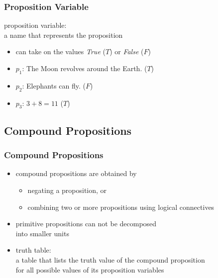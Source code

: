 \documentclass[dvipsnames]{beamer}
\begin{document}
\begin{frame}
  \frametitle{Proposition Variable}

  \begin{definition}
    \alert{proposition variable}:\\
      a name that represents the proposition

    \begin{itemize}
      \item can take on the values \emph {True} ($T$) or \emph{False} ($F$)
    \end{itemize}
  \end{definition}

  \pause
  \begin{example}
    \begin{itemize}
      \item $p_1$: The Moon revolves around the Earth. ($T$)
      \item $p_2$: Elephants can fly. ($F$)
      \item $p_3$: $3+8=11$ ($T$)
    \end{itemize}
  \end{example}
\end{frame}

\subsection{Compound Propositions}

\begin{frame}
  \frametitle{Compound Propositions}

  \begin{itemize}
    \item \alert{compound propositions} are obtained by
    \begin{itemize}
      \item negating a proposition, or
      \item combining two or more propositions using \alert{logical connectives}
    \end{itemize}
    \item \alert{primitive propositions} can not be decomposed\\
      into smaller units
  \end{itemize}

  \pause
  \begin{itemize}
    \item \alert{truth table}:\\
      a table that lists the truth value of the compound proposition\\
      for all possible values of its proposition variables
  \end{itemize}
\end{frame}
\end{document}
